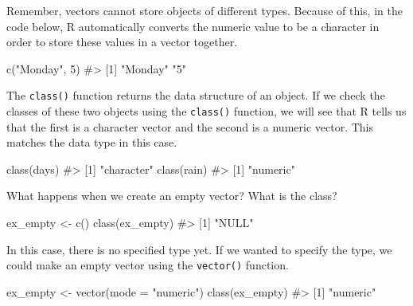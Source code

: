 \documentclass[
  letterpaper,
]{krantz}
\makeatletter
\newenvironment{Shaded}{\begin{snugshade}}{\end{snugshade}}
\newcommand{\AttributeTok}[1]{\textcolor[rgb]{0.40,0.45,0.13}{#1}}
\newcommand{\CommentTok}[1]{\textcolor[rgb]{0.37,0.37,0.37}{#1}}
\newcommand{\DecValTok}[1]{\textcolor[rgb]{0.68,0.00,0.00}{#1}}
\newcommand{\FunctionTok}[1]{\textcolor[rgb]{0.28,0.35,0.67}{#1}}
\newcommand{\NormalTok}[1]{\textcolor[rgb]{0.00,0.23,0.31}{#1}}
\newcommand{\OtherTok}[1]{\textcolor[rgb]{0.00,0.23,0.31}{#1}}
\newcommand{\StringTok}[1]{\textcolor[rgb]{0.13,0.47,0.30}{#1}}
\newenvironment{kframe}{%
\medskip{}
\setlength{\fboxsep}{.8em}
 \def\at@end@of@kframe{}%
 \ifinner\ifhmode%
  \def\at@end@of@kframe{\end{minipage}}%
  \begin{minipage}{\columnwidth}%
 \fi\fi%
 \def\FrameCommand##1{\hskip\@totalleftmargin \hskip-\fboxsep
 \colorbox{shadecolor}{##1}\hskip-\fboxsep
     \hskip-\linewidth \hskip-\@totalleftmargin \hskip\columnwidth}%
 \MakeFramed {\advance\hsize-\width
   \@totalleftmargin\z@ \linewidth\hsize
   \@setminipage}}%
 {\par\unskip\endMakeFramed%
 \at@end@of@kframe}
\renewenvironment{Shaded}{\begin{kframe}}{\end{kframe}}
\makeatother
\begin{document}
Remember, vectors cannot store objects of different types. Because of
this, in the code below, R automatically converts the numeric value to
be a character in order to store these values in a vector together.

\begin{Shaded}
\begin{Highlighting}[]
\FunctionTok{c}\NormalTok{(}\StringTok{"Monday"}\NormalTok{, }\DecValTok{5}\NormalTok{)}
\CommentTok{\#\textgreater{} [1] "Monday" "5"}
\end{Highlighting}
\end{Shaded}

The \texttt{class()} function returns the data structure of an object.
If we check the classes of these two objects using the \texttt{class()}
function, we will see that R tells us that the first is a character
vector and the second is a numeric vector. This matches the data type in
this case.

\begin{Shaded}
\begin{Highlighting}[]
\FunctionTok{class}\NormalTok{(days)}
\CommentTok{\#\textgreater{} [1] "character"}
\FunctionTok{class}\NormalTok{(rain)}
\CommentTok{\#\textgreater{} [1] "numeric"}
\end{Highlighting}
\end{Shaded}

What happens when we create an empty vector? What is the class?

\begin{Shaded}
\begin{Highlighting}[]
\NormalTok{ex\_empty }\OtherTok{\textless{}{-}} \FunctionTok{c}\NormalTok{()}
\FunctionTok{class}\NormalTok{(ex\_empty)}
\CommentTok{\#\textgreater{} [1] "NULL"}
\end{Highlighting}
\end{Shaded}

In this case, there is no specified type yet. If we wanted to specify
the type, we could make an empty vector using the \texttt{vector()}
function.

\begin{Shaded}
\begin{Highlighting}[]
\NormalTok{ex\_empty }\OtherTok{\textless{}{-}} \FunctionTok{vector}\NormalTok{(}\AttributeTok{mode =} \StringTok{"numeric"}\NormalTok{)}
\FunctionTok{class}\NormalTok{(ex\_empty)}
\CommentTok{\#\textgreater{} [1] "numeric"}
\end{Highlighting}
\end{Shaded}
\end{document}
